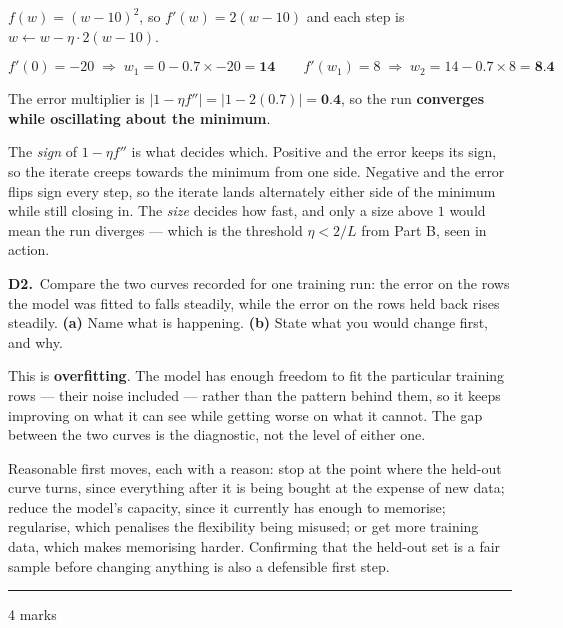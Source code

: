 \documentclass[10pt,a4paper]{article}
\newcommand{\parthead}[2]{\vspace{2pt}\noindent\rule{\linewidth}{0.4pt}\par\vspace{2pt}%
  \noindent{\bfseries Part #1}\hfill{\small #2}\par\vspace{1pt}}
\newcommand{\sol}[1]{\textbf{#1}}
\begin{document}
$f(w) = (w-10)^2$, so $f'(w) = 2(w-10)$ and each step is $w \leftarrow w - \eta \cdot 2(w-10)$.

\[ f'(0) = -20 \;\Rightarrow\; w_1 = 0 - 0.7 \times -20 = \sol{14} \qquad f'(w_1) = 8 \;\Rightarrow\; w_2 = 14 - 0.7 \times 8 = \sol{8.4} \]

The error multiplier is $\lvert 1 - \eta f'' \rvert = \lvert 1 - 2(0.7) \rvert = \sol{0.4}$, so the run \sol{converges while oscillating about the minimum}.

\vspace{2pt}

The \emph{sign} of $1 - \eta f''$ is what decides which. Positive and the error keeps its sign, so the iterate creeps towards the minimum from one side. Negative and the error flips sign every step, so the iterate lands alternately either side of the minimum while still closing in. The \emph{size} decides how fast, and only a size above $1$ would mean the run diverges --- which is the threshold $\eta < 2/L$ from Part B, seen in action.

\vspace{6pt}

\textbf{D2.}\ Compare the two curves recorded for one training run: the error on the rows the model was fitted to falls steadily, while the error on the rows held back rises steadily. \textbf{(a)} Name what is happening. \textbf{(b)} State what you would change first, and why.

\vspace{2pt}

This is \textbf{overfitting}. The model has enough freedom to fit the particular training rows --- their noise included --- rather than the pattern behind them, so it keeps improving on what it can see while getting worse on what it cannot. The gap between the two curves is the diagnostic, not the level of either one.\par\vspace{1mm}Reasonable first moves, each with a reason: stop at the point where the held-out curve turns, since everything after it is being bought at the expense of new data; reduce the model's capacity, since it currently has enough to memorise; regularise, which penalises the flexibility being misused; or get more training data, which makes memorising harder. Confirming that the held-out set is a fair sample before changing anything is also a defensible first step.

\newpage

\parthead{E --- Reasoning}{4 marks}
\end{document}
